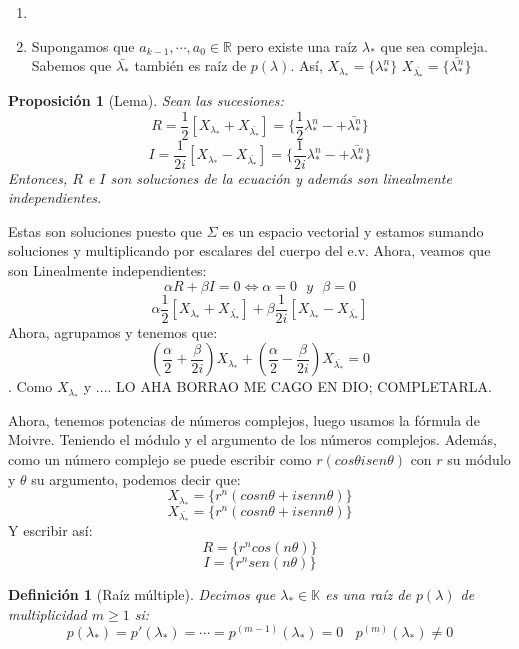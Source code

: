 \documentclass[11pt, a4paper, titlepage]{article}
\makeatletter
\renewenvironment{proof}[1][\proofname] {\vspace{-15pt}\par\pushQED{\qed}\normalfont\topsep6\p@\@plus6\p@\relax\trivlist\item[\hskip\labelsep\it#1\@addpunct{.}]\ignorespaces}{\popQED\endtrivlist\@endpefalse}
\newcommand{\R}{\mathbb{R}}
\theoremstyle{theorem-style}
\newtheorem*{nprop}{Proposición}
\theoremstyle{definition-style}
\newtheorem*{ndef}{Definición}
\theoremstyle{remark-style}
\theoremstyle{example-style}
\makeatother
\begin{document}
        \begin{enumerate}
	\item
	\item Supongamos que $a_{k-1},\cdots,a_0\in \R$ pero existe una raíz
          $\lambda_*$ que sea compleja. Sabemos que $\bar{\lambda_*}$ también es
          raíz de $p(\lambda)$. Así, $X_{\lambda_*}= \{\lambda_*^n\}$
          $X_{\bar{\lambda_*}}= \{\bar{\lambda_*^n}\}$
        \end{enumerate}

\begin{nprop}[Lema]
  Sean las sucesiones:
$$ R= \dfrac{1}{2} [X_{\lambda_*}+ X_{\bar{\lambda_*}}] = \{\dfrac{1}{2}\lambda_*^n -+\bar{\lambda_*^n}\}$$
$$ I = \dfrac{1}{2i}[X_{\lambda_*} -X_{\bar{\lambda_*}}] = \{\dfrac{1}{2i}\lambda_*^n -+\bar{\lambda_*^n}\}$$
Entonces, $R$ e $I$ son soluciones de la ecuación y además son linealmente
independientes.
\end{nprop}
\begin{proof}
  Estas son soluciones puesto que $\Sigma$ es un espacio vectorial y estamos
  sumando soluciones y multiplicando por escalares del cuerpo del e.v.  Ahora,
  veamos que son Linealmente independientes:
	$$ \alpha R + \beta I = 0 \iff \alpha = 0 \ \ \ y \ \ \ \beta  = 0$$
	$$ \alpha \dfrac{1}{2} [X_{\lambda_*}+ X_{\bar{\lambda_*}}]  + \beta \dfrac{1}{2i}[X_{\lambda_*} -X_{\bar{\lambda_*}}]$$
	Ahora, agrupamos y tenemos que:
	$$ (\dfrac{\alpha}{2} + \dfrac{\beta}{2i}) X_{\lambda_*} + (\dfrac{\alpha}{2} - \dfrac{\beta}{2i}) X_{\bar{\lambda_*}} = 0$$.
	Como $X_{\lambda_*}$ y .... LO AHA BORRAO ME CAGO EN DIO; COMPLETARLA.
	
	Ahora, tenemos potencias de números complejos, luego usamos la fórmula
        de Moivre. Teniendo el módulo y el argumento de los números
        complejos. Además, como un número complejo se puede escribir como
        $r(cos \theta i sen\theta)$ con $r$ su módulo y $\theta$ su argumento,
        podemos decir que:
	$$X_{\lambda_*}= \{r^n(cos n\theta + i sen n \theta)\} $$
	$$ X_{\bar{\lambda_*}}= \{r^n(cos n\theta + i sen n \theta)\} $$
	Y escribir así:
	$$ R = \{r^n cos (n\theta)\}$$
	$$ I = \{r^n sen (n\theta)\}$$
      \end{proof}


\begin{ndef}[Raíz múltiple]
  Decimos que $\lambda_* \in \mathbb K$ es una raíz de $p(\lambda)$ de
  multiplicidad $m\geq 1$ si:
	$$ p(\lambda_*) = p'(\lambda_*) =  \cdots = p^{(m-1)}(\lambda_*) = 0 \ \ \ \ p^{(m)}(\lambda_*) \ne 0 $$
      \end{ndef}
\end{document}
